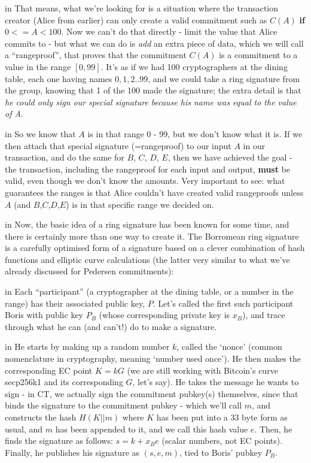 \documentclass[10pt,a4paper]{article}
\begin{document}
 in \noindent That means, what we're looking for is a situation where the transaction creator (Alice from earlier) can only create a valid commitment such as $C(A)$ \textbf{if} $0 <= A < 100$. Now we can't do that directly - limit the value that Alice commits to - but what we can do is \textit{add} an extra piece of data, which we will call a ``rangeproof'', that proves that the commitment $C(A)$ is a commitment to a value in the range $[0,99]$. It's as if we had 100 cryptographers at the dining table, each one having names $0,1,2..99$, and we could take a ring signature from the group, knowing that 1 of the 100 made the signature; the extra detail is that \textit{he could only sign our special signature because his name was equal to the value of A}.

 in \noindent So we know that $A$ is in that range 0 - 99, but we don't know what it is. If we then attach that special signature (=rangeproof) to our input $A$ in our transaction, and do the same for $B$, $C$, $D$, $E$, then we have achieved the goal - the transaction, including the rangeproof for each input and output, \textbf{must} be valid, even though we don't know the amounts. Very important to see: what guarantees the ranges is that Alice couldn't have created valid rangeproofs unless $A$ (and $B$,$C$,$D$,$E$) is in that specific range we decided on.

 in \noindent Now, the basic idea of a ring signature has been known for some time, and there is certainly more than one way to create it. The Borromean ring signature \cite{borromean} is a carefully optimised form of a signature based on a clever combination of hash functions and elliptic curve calculations (the latter very similar to what we've already discussed for Pedersen commitments):

 in \noindent Each ``participant'' (a cryptographer at the dining table, or a number in the range) has their associated public key, $P$. Let's called the first such participant Boris with public key $P_B$ (whose corresponding private key is $x_B$), and trace through what he can (and can't!) do to make a signature.

 in \noindent He starts by making up a random number $k$, called the `nonce' (common nomenclature in cryptography, meaning `number used once'). He then makes the corresponding EC point $K = kG$ (we are still working with Bitcoin's curve secp256k1 and its corresponding $G$, let's say). He takes the message he wants to sign - in CT, we actually sign the commitment pubkey(s) themselves, since that binds the signature to the commitment pubkey - which we'll call $m$, and constructs the hash $H(K||m)$ where $K$ has been put into a 33 byte form as usual, and $m$ has been appended to it, and we call this hash value $e$. Then, he finds the signature as follows: $s = k + x_{B}e$ (scalar numbers, not EC points). Finally, he publishes his signature as $(s,e,m)$, tied to Boris' pubkey $P_B$.
\end{document}
